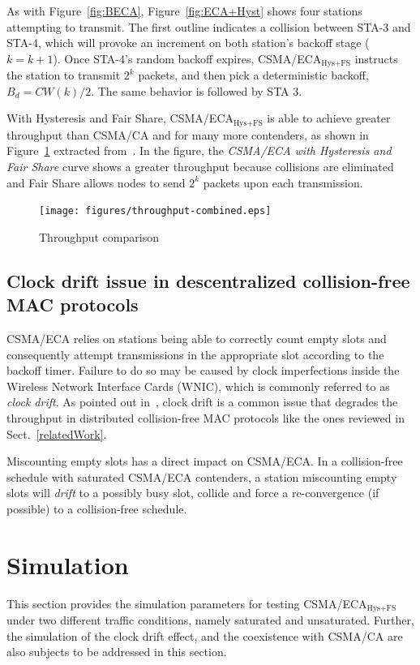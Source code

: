 \documentclass[a4paper,journal]{IEEEtran}
\begin{document}
	As with Figure~\ref{fig:BECA}, Figure~\ref{fig:ECA+Hyst} shows four stations attempting to transmit. The first outline indicates a collision between STA-3 and STA-4, which will provoke an increment on both station's backoff stage ($k=k+1$). Once STA-4's random backoff expires, CSMA/ECA$_{\text{Hys+FS}}$ instructs the station to transmit $2^{k}$ packets, and then pick a deterministic backoff, $B_{d}=CW(k)/2$. The same behavior is followed by STA 3.
	
	With Hysteresis and Fair Share, CSMA/ECA$_{\text{Hys+FS}}$ is able to achieve greater throughput than CSMA/CA and for many more contenders, as shown in Figure~\ref{fig:ECA+H+F-throughput} extracted from~\cite{research2standards}. In the figure, the \emph{CSMA/ECA with Hysteresis and Fair Share} curve shows a greater throughput because collisions are eliminated and Fair Share allows nodes to send $2^{k}$ packets upon each transmission.

	\begin{figure}[htbp]
	\centering
		\texttt{[image: figures/throughput-combined.eps]}
		\caption{Throughput comparison~\cite{research2standards}}
		\label{fig:ECA+H+F-throughput}
	\end{figure}
	
	\subsection{Clock drift issue in descentralized collision-free MAC protocols}\label{clockDrift-issue}
	CSMA/ECA relies on stations being able to correctly count empty slots and consequently attempt transmissions in the appropriate slot according to the backoff timer. Failure to do so may be caused by clock imperfections inside the Wireless Network Interface Cards (WNIC), which is commonly referred to as \emph{clock drift}. As pointed out in~\cite{slotDrift}, clock drift is a common issue that degrades the throughput in distributed collision-free MAC protocols like the ones reviewed in Sect.~\ref{relatedWork}.
	
	Miscounting empty slots has a direct impact on CSMA/ECA. In a collision-free schedule with saturated CSMA/ECA contenders, a station miscounting empty slots will \emph{drift} to a possibly busy slot, collide and force a re-convergence (if possible) to a collision-free schedule. 
	
\section{Simulation}\label{simulations}
This section provides the simulation parameters for testing CSMA/ECA$_{\text{Hys+FS}}$ under two different traffic conditions, namely saturated and unsaturated. Further, the simulation of the clock drift effect, and the coexistence with CSMA/CA are also subjects to be addressed in this section.
\end{document}
